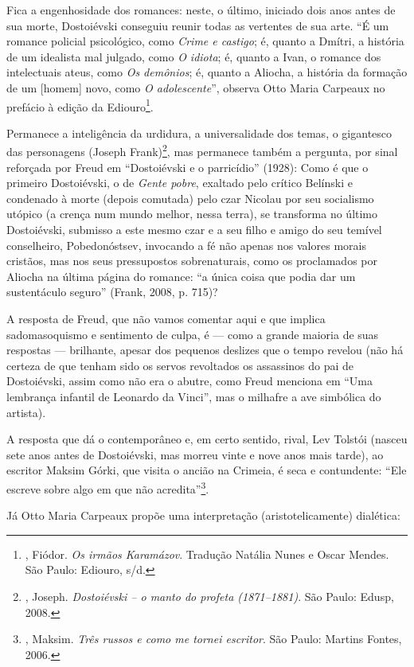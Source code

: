 Fica a engenhosidade dos romances: neste, o último, iniciado dois anos antes de sua morte, Dostoiévski conseguiu reunir todas as vertentes de sua arte. ``É um romance policial psicológico, como \emph{Crime e castigo}; é, quanto a Dmítri, a história de um idealista mal julgado, como \emph{O idiota}; é, quanto a Ivan, o romance dos intelectuais ateus, como \emph{Os demônios}; é, quanto a Aliocha, a história da formação de um [homem] novo, como \emph{O adolescente}'', observa Otto Maria Carpeaux no prefácio à edição da Ediouro\footnote{, Fiódor. \emph{Os irmãos Karamázov}. Tradução Natália Nunes e Oscar Mendes. São Paulo: Ediouro, s/d.}.

Permanece a inteligência da urdidura, a universalidade dos temas, o gigantesco das personagens (Joseph Frank)\footnote{, Joseph. \emph{Dostoiévski -- o manto do profeta (1871--1881)}. São Paulo: Edusp, 2008.}, mas permanece também a pergunta, por sinal reforçada por Freud em ``Dostoiévski e o parricídio'' (1928): Como é que o primeiro Dostoiévski, o de \emph{Gente pobre}, exaltado pelo crítico Belínski e condenado à morte (depois comutada) pelo czar Nicolau  por seu socialismo utópico (a crença num mundo melhor, nessa terra), se transforma no último Dostoiévski, submisso a este mesmo czar e a seu filho e amigo do seu temível conselheiro, Pobedonóstsev, invocando a fé não apenas nos valores morais cristãos, mas nos seus pressupostos
sobrenaturais, como os proclamados por Aliocha na última página do romance: ``a única coisa que podia dar um sustentáculo seguro'' (Frank, 2008, p. 715)?

A resposta de Freud, que não vamos comentar aqui e que implica sadomasoquismo e sentimento de culpa, é --- como a grande maioria de suas respostas --- brilhante, apesar dos pequenos deslizes que o tempo revelou (não há certeza de que tenham sido os servos revoltados os assassinos do pai de Dostoiévski, assim como não era o abutre, como Freud menciona em ``Uma lembrança infantil de Leonardo da Vinci'', mas o milhafre a ave simbólica do artista).

A resposta que dá o contemporâneo e, em certo sentido, rival, Lev Tolstói (nasceu sete anos antes de Dostoiévski, mas morreu vinte e nove anos mais tarde), ao escritor Maksim Górki, que visita o ancião na Crimeia, é seca e contundente: ``Ele escreve sobre algo em que não acredita''\footnote{, Maksim. \emph{Três russos e como me tornei escritor}. São Paulo: Martins Fontes, 2006.}.

Já Otto Maria Carpeaux propõe uma interpretação (aristotelicamente) dialética:

